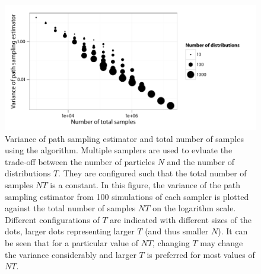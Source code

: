 \begin{figure}[t]
  \UseAltLinespread
  \includegraphics[width=\linewidth]{fig_src/Particle_Iter_Var}
  \caption[Variance of path sampling estimator and total number of samples
  using \protect\smc algorithm]
  {Variance of path sampling estimator and total number of samples using the \smc[2] algorithm. Multiple samplers are used to evluate the trade-off between the number of particles $N$ and the number of distributions $T$. They are configured such that the total number of samples $NT$ is a constant. In this figure, the variance of the path sampling estimator from 100 simulations of each sampler is plotted against the total number of samples $NT$ on the logarithm scale. Different configurations of $T$ are indicated with different sizes of the dots, larger dots representing larger $T$ (and thus smaller $N$). It can be seen that for a particular value of $NT$, changing $T$ may change the variance considerably and larger $T$ is preferred for most values of $NT$.}
  \label{fig:particle iter num}
\end{figure}
